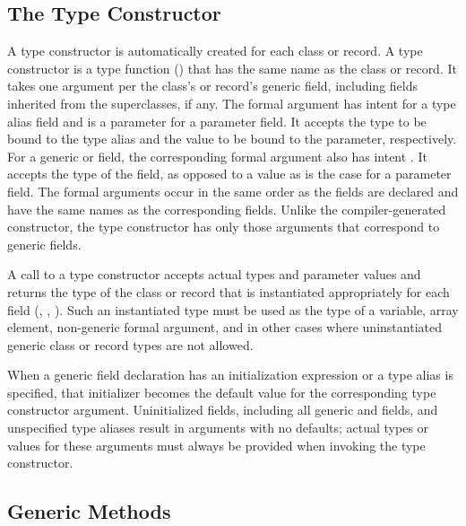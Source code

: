 \subsection{The Type Constructor}
\label{Type_Constructors}

A type constructor is automatically created for each class or record.
A type constructor is a type function () that has
the same name as the class or record.  It takes one argument per the
class's or record's generic field, including fields inherited from the
superclasses, if any.
The formal argument has intent  for a type alias field and is a
parameter for a parameter field. It accepts the type to be bound
to the type alias and the value to be bound to the parameter, respectively.
For a generic  or  field, the corresponding
formal argument also has intent . It accepts the type
of the field, as opposed to a value as is the case for a parameter field.
The formal arguments occur in the same order as the fields are
declared and have the same names as the corresponding fields.
Unlike the compiler-generated constructor, the type constructor has only
those arguments that correspond to generic fields.

A call to a type constructor accepts actual types and parameter values
and returns the type of the class or record that is instantiated
appropriately for each field
(, ,
).
Such an instantiated type must be used as the type of a variable,
array element, non-generic formal argument, and in other cases
where uninstantiated generic class or record types are not allowed.

When a generic field declaration has an initialization expression
or a type alias is specified, that initializer becomes the default value
for the corresponding type constructor argument.  Uninitialized
fields, including all generic  and  fields,
and unspecified type aliases result in arguments with no defaults;
actual types or values for these arguments must always be provided
when invoking the type constructor.

\subsection{Generic Methods}
\label{Generic_Methods}

